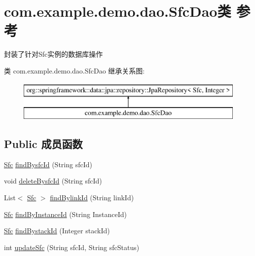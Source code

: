 \hypertarget{interfacecom_1_1example_1_1demo_1_1dao_1_1_sfc_dao}{}\section{com.\+example.\+demo.\+dao.\+Sfc\+Dao类 参考}
\label{interfacecom_1_1example_1_1demo_1_1dao_1_1_sfc_dao}


封装了针对\+Sfc实例的数据库操作  


类 com.\+example.\+demo.\+dao.\+Sfc\+Dao 继承关系图\+:\begin{figure}[H]
\begin{center}
\leavevmode
\includegraphics[height=2.000000cm]{interfacecom_1_1example_1_1demo_1_1dao_1_1_sfc_dao}
\end{center}
\end{figure}
\subsection*{Public 成员函数}
\begin{DoxyCompactItemize}
\item 
\mbox{\hyperlink{classcom_1_1example_1_1demo_1_1modular_1_1_sfc}{Sfc}} \mbox{\hyperlink{interfacecom_1_1example_1_1demo_1_1dao_1_1_sfc_dao_a96969784f7889c1b2d92c65f19c72e29}{find\+Bysfc\+Id}} (String sfc\+Id)
\item 
void \mbox{\hyperlink{interfacecom_1_1example_1_1demo_1_1dao_1_1_sfc_dao_a5a1c3c16057f3108203797450c591d66}{delete\+Bysfc\+Id}} (String sfc\+Id)
\item 
List$<$ \mbox{\hyperlink{classcom_1_1example_1_1demo_1_1modular_1_1_sfc}{Sfc}} $>$ \mbox{\hyperlink{interfacecom_1_1example_1_1demo_1_1dao_1_1_sfc_dao_a987b199bbc98d689334f362641b370de}{find\+Bylink\+Id}} (String link\+Id)
\item 
\mbox{\hyperlink{classcom_1_1example_1_1demo_1_1modular_1_1_sfc}{Sfc}} \mbox{\hyperlink{interfacecom_1_1example_1_1demo_1_1dao_1_1_sfc_dao_a575381c8310bd0ae19916906389f6ab0}{find\+By\+Instance\+Id}} (String Instance\+Id)
\item 
\mbox{\hyperlink{classcom_1_1example_1_1demo_1_1modular_1_1_sfc}{Sfc}} \mbox{\hyperlink{interfacecom_1_1example_1_1demo_1_1dao_1_1_sfc_dao_a8e5fd376717cd55f6b3ae8521dd34b3e}{find\+Bystack\+Id}} (Integer stack\+Id)
\item 
int \mbox{\hyperlink{interfacecom_1_1example_1_1demo_1_1dao_1_1_sfc_dao_a6f67e6799aef631a64ed65763adc534f}{update\+Sfc}} (String sfc\+Id, String sfc\+Status)
\end{DoxyCompactItemize}


